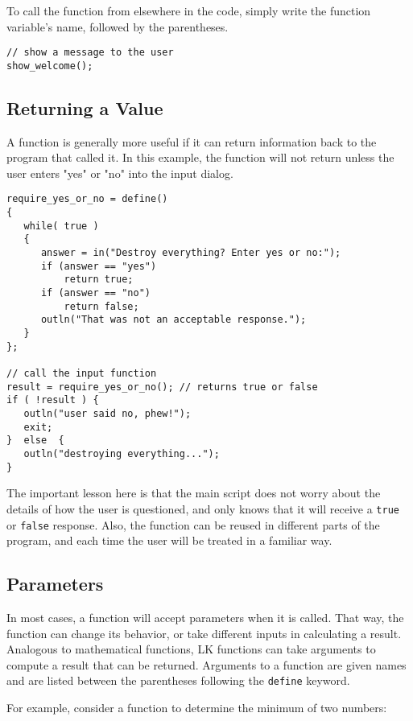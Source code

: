\documentclass{article}
\begin{document}
To call the function from elsewhere in the code, simply write the function variable's name, followed by the parentheses.  

\begin{verbatim}
// show a message to the user
show_welcome();
\end{verbatim}

\subsection{Returning a Value}

A function is generally more useful if it can return information back to the program that called it.  In this example, the function will not return unless the user enters "yes" or "no" into the input dialog.

\begin{verbatim}
require_yes_or_no = define()
{
   while( true )
   {
      answer = in("Destroy everything? Enter yes or no:");
      if (answer == "yes")
          return true;
      if (answer == "no")
          return false;
      outln("That was not an acceptable response.");
   }
};

// call the input function
result = require_yes_or_no(); // returns true or false
if ( !result ) {
   outln("user said no, phew!");
   exit;
}  else  {
   outln("destroying everything...");
}
\end{verbatim}

The important lesson here is that the main script does not worry about the details of how the user is questioned, and only knows that it will receive a \texttt{true} or \texttt{false} response.  Also, the function can be reused in different parts of the program, and each time the user will be treated in a familiar way.

\subsection{Parameters}

In most cases, a function will accept parameters when it is called.  That way, the function can change its behavior, or take different inputs in calculating a result.  Analogous to mathematical functions, LK functions can take arguments to compute a result that can be returned.  Arguments to a function are given names and are listed between the parentheses following the \texttt{define} keyword.  

For example, consider a function to determine the minimum of two numbers:
\end{document}
